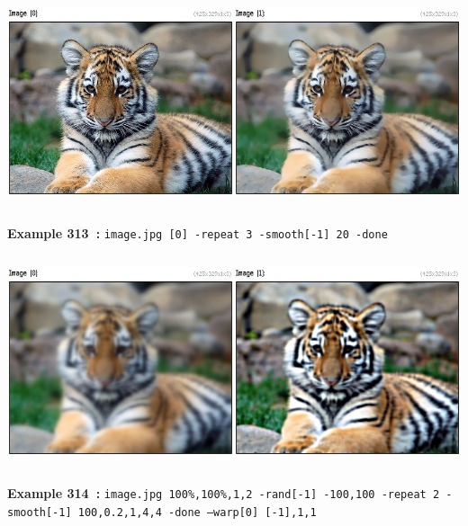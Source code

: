 \documentclass[a4paper,11pt,twoside]{book}
\begin{document}
\begin{center}\includegraphics[keepaspectratio=true,height=7cm,width=\textwidth]{img/gmic_def313.jpg}\\
{\footnotesize \textbf{Example 313~:} \texttt{image.jpg [0] -repeat 3 -smooth[-1] 20 -done}}
\\\includegraphics[keepaspectratio=true,height=7cm,width=\textwidth]{img/gmic_def314.jpg}\\
{\footnotesize \textbf{Example 314~:} \texttt{image.jpg 100\%,100\%,1,2 -rand[-1] -100,100 -repeat 2 -smooth[-1] 100,0.2,1,4,4 -done --warp[0] [-1],1,1}}
\end{center}
\end{document}

